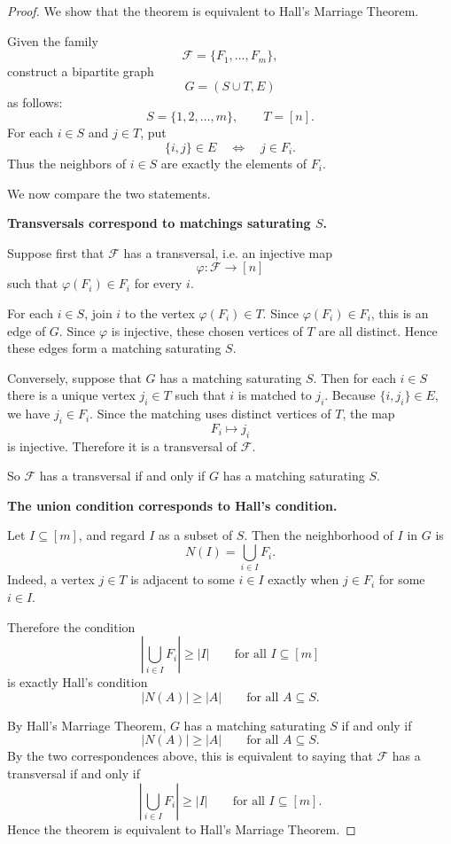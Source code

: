 \documentclass[11pt, a4paper]{ctexrep}
\begin{document}
\begin{proof}
    We show that the theorem is equivalent to Hall's Marriage Theorem.

    Given the family
    \[
        \mathcal F=\{F_1,\dots,F_m\},
    \]
    construct a bipartite graph
    \[
        G=(S\cup T,E)
    \]
    as follows:
    \[
        S=\{1,2,\dots,m\},\qquad T=[n].
    \]
    For each $i\in S$ and $j\in T$, put
    \[
        \{i,j\}\in E \quad \Longleftrightarrow \quad j\in F_i.
    \]
    Thus the neighbors of $i\in S$ are exactly the elements of $F_i$.

    We now compare the two statements.

    \medskip

    \noindent
    \textbf{Transversals correspond to matchings saturating $S$.}

    Suppose first that $\mathcal F$ has a transversal, i.e. an injective map
    \[
        \varphi:\mathcal F\to [n]
    \]
    such that $\varphi(F_i)\in F_i$ for every $i$.

    For each $i\in S$, join $i$ to the vertex $\varphi(F_i)\in T$.
    Since $\varphi(F_i)\in F_i$, this is an edge of $G$.
    Since $\varphi$ is injective, these chosen vertices of $T$ are all distinct.
    Hence these edges form a matching saturating $S$.

    Conversely, suppose that $G$ has a matching saturating $S$.
    Then for each $i\in S$ there is a unique vertex $j_i\in T$ such that
    $i$ is matched to $j_i$.
    Because $\{i,j_i\}\in E$, we have $j_i\in F_i$.
    Since the matching uses distinct vertices of $T$, the map
    \[
        F_i\longmapsto j_i
    \]
    is injective. Therefore it is a transversal of $\mathcal F$.

    So $\mathcal F$ has a transversal if and only if $G$ has a matching
    saturating $S$.

    \medskip

    \noindent
    \textbf{The union condition corresponds to Hall's condition.}

    Let $I\subseteq [m]$, and regard $I$ as a subset of $S$.
    Then the neighborhood of $I$ in $G$ is
    \[
        N(I)=\bigcup_{i\in I}F_i.
    \]
    Indeed, a vertex $j\in T$ is adjacent to some $i\in I$ exactly when
    $j\in F_i$ for some $i\in I$.

    Therefore the condition
    \[
        \left|\bigcup_{i\in I}F_i\right|\ge |I|
        \qquad\text{for all }I\subseteq [m]
    \]
    is exactly Hall's condition
    \[
        |N(A)|\ge |A|
        \qquad\text{for all }A\subseteq S.
    \]

    \medskip

    By Hall's Marriage Theorem, $G$ has a matching saturating $S$ if and only if
    \[
        |N(A)|\ge |A|\qquad\text{for all }A\subseteq S.
    \]
    By the two correspondences above, this is equivalent to saying that
    $\mathcal F$ has a transversal if and only if
    \[
        \left|\bigcup_{i\in I}F_i\right|\ge |I|
        \qquad\text{for all }I\subseteq [m].
    \]
    Hence the theorem is equivalent to Hall's Marriage Theorem.
\end{proof}
\end{document}
